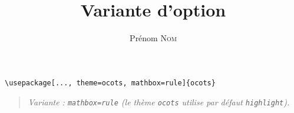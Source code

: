 \documentclass[11pt]{ocots-book}
\title{Variante d'option}
\author{Prénom \textsc{Nom}}
\newcommand{\ocotsvariantnote}[1]{\begin{quote}\itshape Variante : #1\end{quote}}
\begin{document}
\maketitle

\begin{lstlisting}
\usepackage[..., theme=ocots, mathbox=rule]{ocots}
\end{lstlisting}
\ocotsvariantnote{\texttt{mathbox=rule} (le th\`eme \texttt{ocots} utilise par d\'efaut \texttt{highlight}).}

\end{document}

